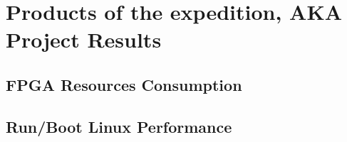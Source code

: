 \chapter{Products of the expedition, AKA Project Results}

\section{FPGA Resources Consumption}

\section{Run/Boot Linux Performance}